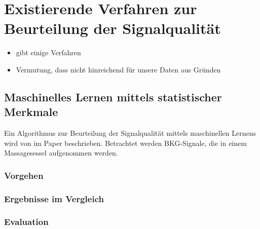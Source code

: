 \chapter{Existierende Verfahren zur Beurteilung der Signalqualität}\label{existierende}

\begin{itemize}
	\item gibt einige Verfahren
	\item Vermutung, dass nicht hinreichend für unsere Daten	 aus Gründen
\end{itemize}

\section{Maschinelles Lernen mittels statistischer Merkmale}

Ein Algorithmus zur Beurteilung der Signalqualität mittels maschinellen Lernens wird von \citeauthor{Sadek2016} im Paper  beschrieben. Betrachtet werden \ac{BKG}-Signale, die in einem Massagesessel aufgenommen werden.

\subsection{Vorgehen}

\subsection{Ergebnisse im Vergleich}

\subsection{Evaluation}


